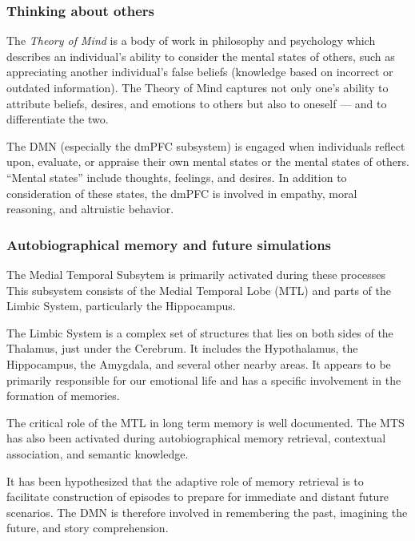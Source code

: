 \documentclass[a4paper, amsfonts, amssymb, amsmath, reprint, showkeys, nofootinbib, twoside]{revtex4-1}
\begin{document}
\subsubsection{Thinking about others}

The \textit{Theory of Mind} is a body of work in philosophy and psychology which
describes an individual's ability to consider the mental states of others, such as
appreciating another individual's false beliefs (knowledge based on incorrect or
outdated information). The Theory of Mind captures not only one's ability to
attribute beliefs, desires, and emotions to others but also to oneself --- and to
differentiate the two. \cite{autistictheoryofmind}

The DMN (especially the dmPFC subsystem) is engaged when individuals reflect upon,
evaluate, or appraise their own mental states or the mental states of others. ``Mental
states'' include thoughts, feelings, and desires. \cite{theoryofmind} In addition to
consideration of these states, the dmPFC is involved in empathy, moral reasoning,
and altruistic behavior. \cite{defaultnetworkadaptive,dmpfcothers,dmpfcaltruism}

\subsubsection{Autobiographical memory and future simulations}


The Medial Temporal Subsytem is primarily activated during these processes
This subsystem consists of the Medial Temporal Lobe (MTL) and parts of the Limbic
System, particularly the Hippocampus.

The Limbic System is a complex set of structures that lies on both sides of the
Thalamus, just under the Cerebrum. It includes the Hypothalamus, the Hippocampus, the
Amygdala, and several other nearby areas. It appears to be primarily responsible for
our emotional life and has a specific involvement in the formation of memories. \cite{limbic}

The critical role of the MTL in long term memory is well documented. \cite{mtl}
The MTS has also been activated during autobiographical memory retrieval,
contextual association, and semantic knowledge. \cite{defaultnetworkadaptive}

It has been hypothesized that the adaptive role of memory retrieval is to facilitate
construction of episodes to prepare for immediate and distant future scenarios. \cite{defaultnetworkadaptive}
The DMN is therefore involved in remembering the past, imagining the future, and story
comprehension. \cite{defaultnetworkadaptive}
\end{document}
